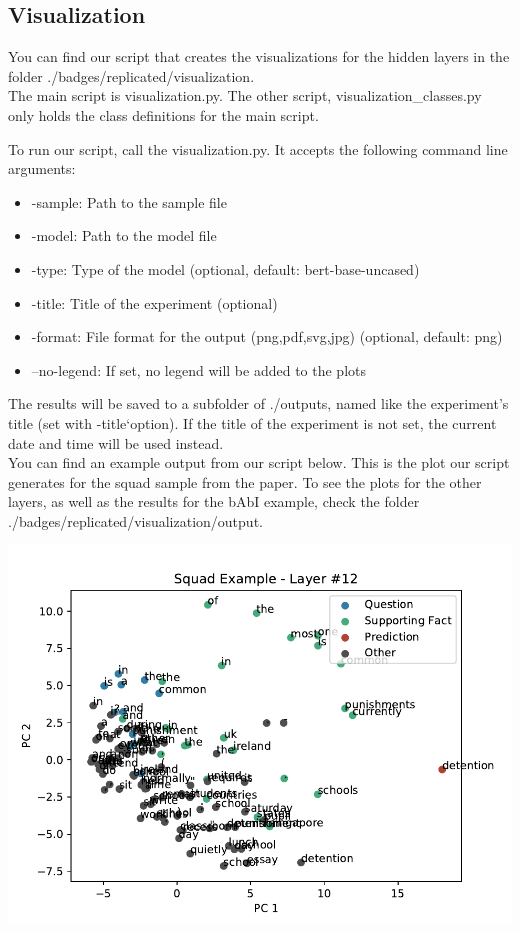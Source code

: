 \documentclass{article}
\begin{document}
	\subsection{Visualization}
	You can find our script that creates the visualizations for the hidden layers in the folder ./badges/replicated/visualization.\\
	
	The main script is visualization.py. The other script, visualization\_classes.py only holds the class definitions for the main script.
	
	To run our script, call the visualization.py. It accepts the following command line arguments:
	
	\begin{itemize}
		\item -sample: Path to the sample file
		\item -model: Path to the model file
		\item -type: Type of the model (optional, default: bert-base-uncased)
		\item -title: Title of the experiment (optional)
		\item -format: File format for the output (png,pdf,svg,jpg) (optional, default: png)
		\item --no-legend: If set, no legend will be added to the plots
	\end{itemize}

	The results will be saved to a subfolder of ./outputs, named like the experiment's title (set with -title`option). If the title of the experiment is not set, the current date and time will be used instead.\\

	
	You can find an example output from our script below. This is the plot our script generates for the squad sample from the paper. To see the plots for the other layers, as well as the results for the bAbI example, check the folder ./badges/replicated/visualization/output.
	
	\begin{center}
		\includegraphics[scale=0.6]{../badges/replicated/visualization/output/squad-example/layer-12.pdf}
	\end{center}
	
\end{document}
